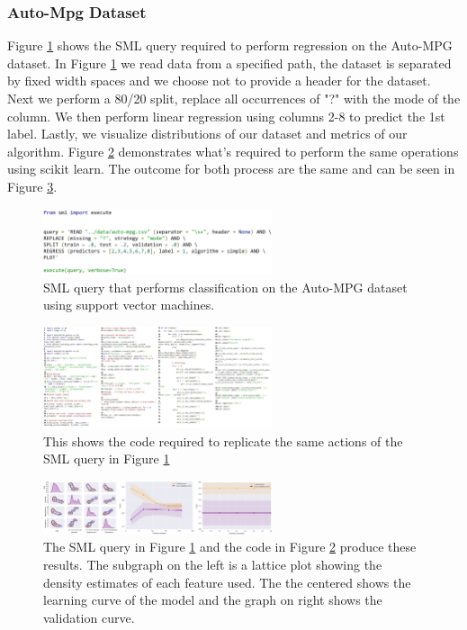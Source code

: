 \documentclass[jair,twoside,11pt,theapa]{article}
\begin{document}
\subsubsection{Auto-Mpg Dataset}
Figure \ref{fig:SML:AutoMPGQuery} shows the SML query required to perform regression on the Auto-MPG dataset. In Figure \ref{fig:SML:AutoMPGQuery} we read data from a specified path, the dataset is separated by fixed width spaces and we choose not to provide a header for the dataset.  Next we perform a 80/20 split, replace all occurrences of "?" with the mode of the column. We then perform linear regression using columns 2-8 to predict the 1st label. Lastly, we visualize distributions of our dataset and metrics of our algorithm. Figure \ref{fig:Manual:Auto-MPG} demonstrates what's required to perform the same operations using scikit learn. The outcome for both process are the same and can be seen in Figure \ref{fig:AutoMPG:Results}.

\begin{figure}
\includegraphics[width=0.6\textwidth]{figs/autompg_sml.png}
\centering
\caption{SML query that performs classification on the Auto-MPG dataset using support vector machines.}
\label{fig:SML:AutoMPGQuery}
\end{figure}

\begin{figure}
\includegraphics[width=0.6\textwidth]{figs/auto-mpg_manual.png}
\centering
\caption{This shows the code required to replicate the same actions of the SML query in Figure \ref{fig:SML:AutoMPGQuery}}
\label{fig:Manual:Auto-MPG}
\end{figure}

\begin{figure}
\includegraphics[width=0.6\textwidth]{figs/auto-mpg-results.png}
\centering
\caption{The SML query in Figure \ref{fig:SML:AutoMPGQuery}  and the code in Figure \ref{fig:Manual:Auto-MPG} produce these results. The subgraph on the left is a lattice plot showing the density estimates of each feature used. The the centered shows the learning curve of the model and the graph on right shows the validation curve.}
\label{fig:AutoMPG:Results}
\end{figure}
\end{document}
